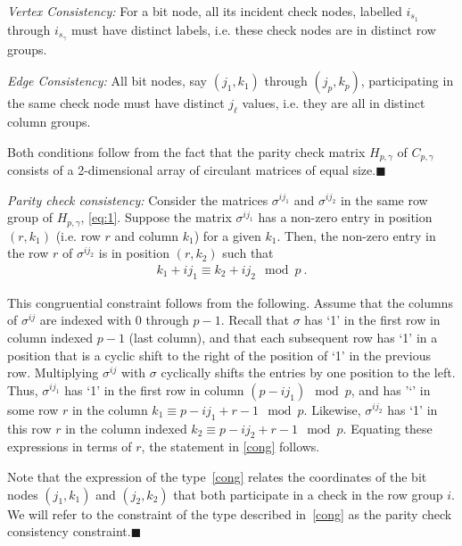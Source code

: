 \textit{Vertex Consistency:} For a bit node, all its incident
check nodes, labelled $i_{s_1}$ through $i_{s_\gamma}$ must have
distinct labels, i.e. these check nodes are in distinct row
groups.

\textit{Edge Consistency:} All bit nodes, say $(j_{1},k_{1})$
through $(j_{p},k_{p})$, participating in the same check node must
have distinct $j_\ell$ values, i.e. they are all in distinct
column groups.

Both conditions follow from the fact that the parity check matrix
$H_{p,\gamma}$ of $C_{p,\gamma}$ consists of a 2-dimensional array
of circulant matrices of equal size.\hfill$\blacksquare$

\textit{Parity check consistency:} Consider the matrices
$\sigma^{ij_1}$ and $\sigma^{ij_2}$ in the same row group of
$H_{p,\gamma}$, \eqref{eq:1}. Suppose the matrix $\sigma^{ij_1}$
has a non-zero entry in position $(r,k_1)$ (i.e. row $r$ and
column $k_1$) for a given $k_1$. Then, the non-zero entry in the
row $r$ of $\sigma^{ij_2}$ is in position $(r,k_2)$ such that
\begin{eqnarray}\label{cong}
k_1+ij_1 \equiv k_2+ij_2 \mod p~.
\end{eqnarray}

This congruential constraint follows from the following. Assume
that the columns of $\sigma^{ij}$ are indexed with $0$ through
$p-1$. Recall that $\sigma$ has `1' in the first row in column
indexed $p-1$ (last column), and that each subsequent row has `1'
in a position that is a cyclic shift to the right of the position
of `1' in the previous row. Multiplying $\sigma^{ij}$ with
$\sigma$ cyclically shifts the entries by one position to the
left. Thus, $\sigma^{ij_1}$ has `1' in the first row in column
$(p-ij_1) \mod p$, and has '`' in some row $r$ in the column $k_1
\equiv p-ij_1+r-1 \mod p$.  Likewise, $\sigma^{ij_2}$ has `1' in
this row $r$ in the column indexed $k_2 \equiv p-ij_2+r-1 \mod p$.
Equating these expressions in terms of $r$, the statement in
\eqref{cong} follows.

Note that the expression of the type~\eqref{cong} relates the
coordinates of the bit nodes $(j_1,k_1)$ and $(j_2,k_2)$ that both
participate in a check in the row group $i$. We will refer to the
constraint of the type described in~\eqref{cong} as the parity
check consistency constraint.\hfill$\blacksquare$

